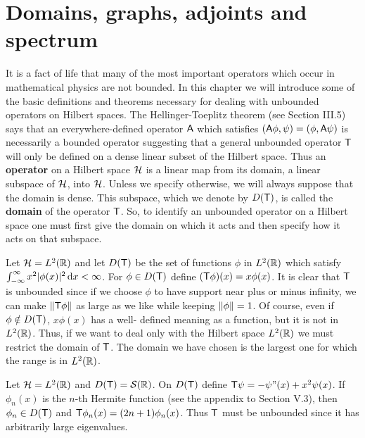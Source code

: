 \section{Domains, graphs, adjoints and spectrum}

It is a fact of life that many of the most important operators which occur in mathematical physics are not bounded. In this chapter we will introduce some of the basic definitions and theorems necessary for dealing with unbounded operators on Hilbert spaces. The Hellinger-Toeplitz theorem (see Section III.5) says that an everywhere-defined operator $\mathsf{A}$ which satisfies $(\mathsf{A} \phi, \psi) = (\phi, \mathsf{A} \psi) $ is necessarily a bounded operator suggesting that a general unbounded operator $\mathsf{T}$ will only be defined on a dense linear subset of the Hilbert space.
Thus an \textbf{operator} on a Hilbert space $\mathcal{H}$ is a linear map from its domain, a linear subspace of $\mathcal{H}$, into $\mathcal{H}$. Unless we specify otherwise, we will always suppose that the domain is dense. This subspace, which we denote by $D( \mathsf{T})$, is called the \textbf{domain} of the operator $\mathsf{T}$. So, to identify an unbounded operator on a Hilbert space one must first give the domain on which it acts and then specify how it acts on that subspace.

\begin{example}
Let $\mathcal{H} = L^{2}(\mathbb{R})$ and let $D(\mathsf{T})$ be the set of functions $\phi$ in $L^{2}(\mathbb{R})$ which satisfy $\int_{-\infty}^{\infty} x^2 |\phi(x)|^2 \, \mathrm{d} x < \infty$. For $\phi \in D(\mathsf{T})$ define $(\mathsf{T} \phi)(x) = x \phi(x)$. It is clear that $\mathsf{T}$ is unbounded since if we choose $\phi$ to have support near plus or minus infinity, we can make $\left \Vert \mathsf{T} \phi \right \Vert$ as large as we like while keeping $\left \Vert \phi \right \Vert =1$. Of course, even if $\phi \notin D(\mathsf{T})$, $x \phi(x)$ has a well- defined meaning as a function, but it is not in $L^{2}(\mathbb{R})$. Thus, if we want to deal only with the Hilbert space $L^{2}(\mathbb{R})$ we must restrict the domain of $\mathsf{T}$. The domain we have chosen is the largest one for which the range is in $L^{2}(\mathbb{R})$.
\end{example}

\begin{example}
Let $\mathcal{H} = L^{2}(\mathbb{R})$ and $D(\mathsf{T})= \mathcal{S}(\mathbb{R})$. On $D(\mathsf{T})$ define $\mathsf{T} \psi = - \psi"(x) + x^2 \psi(x)$. If $\phi_n(x)$ is the $n$-th Hermite function (see the appendix to Section V.3), then $\phi_n \in D(\mathsf{T})$ and $\mathsf{T}\phi_n(x) = (2n+1) \phi_n(x)$. Thus $\mathsf{T}$ must be unbounded since it has arbitrarily large eigenvalues.
\end{example}

